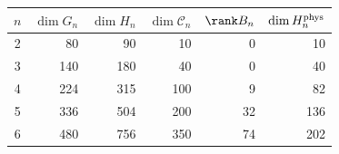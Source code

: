 \begin{tabular}{c|r|r|r|r|r}
$n$ & $\dim G_n$ & $\dim H_n$ & $\dim \mathcal C_n$ & $\rank B_n$ & $\dim H^{\rm phys}_n$ \\
\hline
2 & 80 & 90 & 10 & 0 & 10 \\
3 & 140 & 180 & 40 & 0 & 40 \\
4 & 224 & 315 & 100 & 9 & 82 \\
5 & 336 & 504 & 200 & 32 & 136 \\
6 & 480 & 756 & 350 & 74 & 202 \\
\end{tabular}
